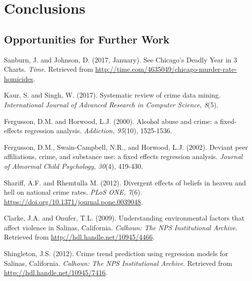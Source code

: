 \documentclass[12pt]{article}
\begin{document}
	\section{Conclusions}


\subsection{Opportunities for Further Work}








	\newpage
	\begin{thebibliography}{12}
	
Sanburn, J. and Johnson, D. (2017, January). See Chicago's Deadly Year in 3 Charts. \textit{Time}. Retrieved from \href{http://time.com/4635049/chicago-murder-rate-homicides}{http://time.com/4635049/chicago-murder-rate-homicides}.

Kaur, S. and Singh, W. (2017). Systematic review of crime data mining. \textit{International Journal of Advanced Research in Computer Science, 8}(5).

Fergusson, D.M. and Horwood, L.J. (2000). Alcohol abuse and crime: a fixed-effects regression analysis. \textit{Addiction, 95}(10), 1525-1536.

Fergusson, D.M., Swain-Campbell, N.R., and Horwood, L.J. (2002). Deviant peer affiliations, crime, and substance use: a fixed effects regression analysis. \textit{Journal of Abnormal Child Psychology, 30}(4), 419-430.

Shariff, A.F. and Rhemtulla M. (2012). Divergent effects of beliefs in heaven and hell on national crime rates. \textit{PLoS ONE, 7}(6). \href{https://doi.org/10.1371/journal.pone.0039048}{https://doi.org/10.1371/journal.pone.0039048}.

Clarke, J.A. and Onufer, T.L. (2009). Understanding environmental factors that affect violence in Salinas, California. \textit{Calhoun: The NPS Institutional Archive}. Retrieved from \href{http://hdl.handle.net/10945/4466}{http://hdl.handle.net/10945/4466}.

Shingleton, J.S. (2012). Crime trend prediction using regression models for Salinas, California. \textit{Calhoun: The NPS Institutional Archive}. Retrieved from \href{http://hdl.handle.net/10945/7416}{http://hdl.handle.net/10945/7416}.


\end{thebibliography}
\end{document}
